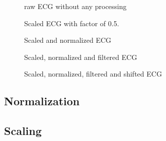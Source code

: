\documentclass{article}
\begin{document}
\begin{figure}[htbp]
\centering
  \caption{raw ECG without any processing}\label{fig:raw}
  
  \caption{Scaled ECG with factor of 0.5.}\label{fig:sc}
  
  \caption{Scaled and normalized ECG}\label{fig:sc_n}

  \caption{Scaled, normalized and filtered ECG}\label{fig:sc_n_bp}

  \caption{Scaled, normalized, filtered and shifted ECG}\label{fig:sc_n_bp_sh}
\end{figure}


\subsection{Normalization}
\subsection{Scaling}
\end{document}
